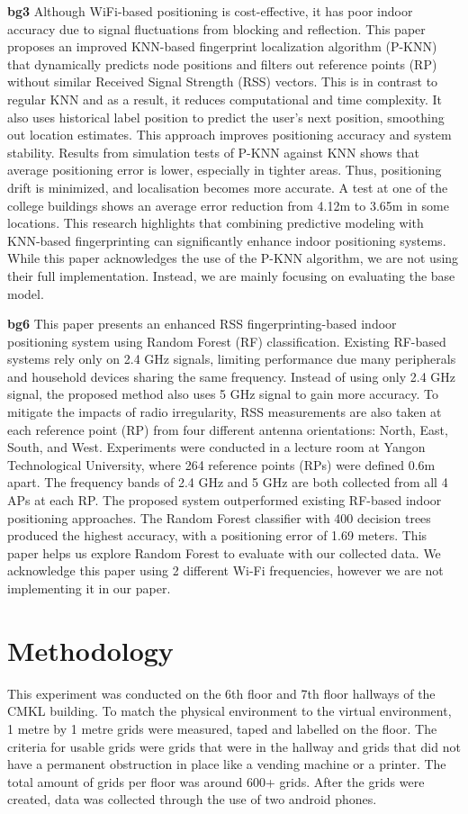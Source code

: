 \documentclass[conference]{IEEEtran}
\begin{document}
	\textbf{bg3}
	Although WiFi-based positioning is cost-effective, it has poor indoor accuracy due to  signal fluctuations from blocking and reflection. This paper proposes an improved KNN-based fingerprint localization algorithm (P-KNN) that dynamically predicts node positions and filters out reference points (RP) without similar Received Signal Strength (RSS) vectors. This is in contrast to regular KNN and as a result, it reduces computational and time complexity. It also uses historical label position to predict the user’s next position, smoothing out location estimates. This approach improves positioning accuracy and system stability.
	Results from simulation tests of P-KNN against KNN shows that average positioning error is lower, especially in tighter areas. Thus, positioning drift is minimized, and localisation becomes more accurate. A test at one of the college buildings shows an average error reduction from 4.12m to 3.65m in some locations. This research highlights that combining predictive modeling with KNN-based fingerprinting can significantly enhance indoor positioning systems. While this paper acknowledges the use of the P-KNN algorithm, we are not using their full implementation. Instead, we are mainly focusing on evaluating the base model.
	
	\textbf{bg6}
	This paper presents an enhanced RSS fingerprinting-based indoor positioning system using Random Forest (RF) classification. Existing RF-based systems rely only on 2.4 GHz signals, limiting performance due many peripherals and household devices sharing the same frequency. Instead of using only 2.4 GHz signal, the proposed method also uses 5 GHz signal to gain more accuracy. To mitigate the impacts of radio irregularity, RSS measurements are also taken at each reference point (RP) from four different antenna orientations: North, East, South, and West. 
	Experiments were conducted in a lecture room at Yangon Technological University, where 264 reference points (RPs) were defined 0.6m apart. The frequency bands of 2.4 GHz and 5 GHz are both collected from all 4 APs at each RP. The proposed system outperformed existing RF-based indoor positioning approaches. The Random Forest classifier with 400 decision trees produced the highest accuracy, with a positioning error of 1.69 meters. This paper helps us explore Random Forest to evaluate with our collected data. We acknowledge this paper using 2 different Wi-Fi frequencies, however we are not implementing it in our paper.
	
	\section{Methodology}
	This experiment was conducted on the 6th floor and 7th floor hallways of the CMKL building. To match the physical environment to the virtual environment, 1 metre by 1 metre grids were measured, taped and labelled on the floor. The criteria for usable grids were grids that were in the hallway and grids that did not have a permanent obstruction in place like a vending machine or a printer. The total amount of grids per floor was around 600+ grids. After the grids were created, data was collected through the use of two android phones. 
	
\end{document}
